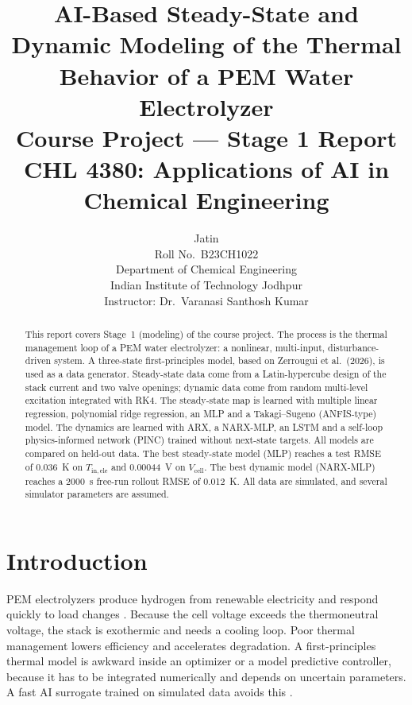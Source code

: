 \documentclass[11pt,a4paper]{article}
\title{\vspace*{2cm}\textbf{AI-Based Steady-State and Dynamic Modeling of the Thermal Behavior of a PEM Water Electrolyzer}\\[6pt]
\large Course Project --- Stage 1 Report\\[2pt]
\large CHL 4380: Applications of AI in Chemical Engineering}
\author{Jatin\\ Roll No.\ B23CH1022\\ Department of Chemical Engineering\\ Indian Institute of Technology Jodhpur\\[8pt]
Instructor: Dr.\ Varanasi Santhosh Kumar}
\date{}
\newcommand{\Tin}{T_{\mathrm{in,ele}}}
\newcommand{\Vcell}{V_{\mathrm{cell}}}
\begin{document}
\maketitle
\thispagestyle{empty}
\vspace{1.5cm}

\begin{abstract}
\noindent
This report covers Stage~1 (modeling) of the course project. The process is the thermal management loop of a PEM water electrolyzer: a nonlinear, multi-input, disturbance-driven system. A three-state first-principles model, based on Zerrougui et al.\ (2026), is used as a data generator. Steady-state data come from a Latin-hypercube design of the stack current and two valve openings; dynamic data come from random multi-level excitation integrated with RK4. The steady-state map is learned with multiple linear regression, polynomial ridge regression, an MLP and a Takagi--Sugeno (ANFIS-type) model. The dynamics are learned with ARX, a NARX-MLP, an LSTM and a self-loop physics-informed network (PINC) trained without next-state targets. All models are compared on held-out data. The best steady-state model (MLP) reaches a test RMSE of 0.036~K on $\Tin$ and 0.00044~V on $\Vcell$. The best dynamic model (NARX-MLP) reaches a 2000~s free-run rollout RMSE of 0.012~K. All data are simulated, and several simulator parameters are assumed.
\end{abstract}
\clearpage

\tableofcontents
\clearpage

\section{Introduction}
PEM electrolyzers produce hydrogen from renewable electricity and respond quickly to load changes \cite{zerrougui2026,carmo2013}. Because the cell voltage exceeds the thermoneutral voltage, the stack is exothermic and needs a cooling loop. Poor thermal management lowers efficiency and accelerates degradation. A first-principles thermal model is awkward inside an optimizer or a model predictive controller, because it has to be integrated numerically and depends on uncertain parameters. A fast AI surrogate trained on simulated data avoids this \cite{lectures}.
\end{document}
